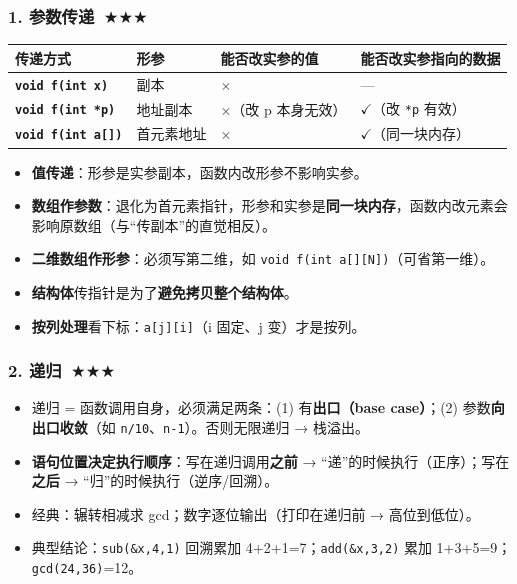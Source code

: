 \documentclass[UTF8,zihao=-4,a4paper]{ctexart}
\newcommand{\cstar}{\textcolor{deepred}{$\bigstar$}}
\newcommand{\cok}{\textcolor{codegreen}{$\checkmark$}}
\newcommand{\cbad}{\textcolor{deepred}{$\times$}}
\begin{document}
\subsubsection*{1. 参数传递\ \cstar\cstar\cstar}
\begin{center}\small
\begin{tabularx}{\linewidth}{>{\bfseries}p{3.4cm} X X X}
\toprule
传递方式 & 形参 & 能否改实参的值 & 能否改实参指向的数据\\
\midrule
\texttt{void f(int x)} & 副本 & \cbad & —\\
\texttt{void f(int *p)} & 地址副本 & \cbad（改 p 本身无效） & \cok（改 \texttt{*p} 有效）\\
\texttt{void f(int a[])} & 首元素地址 & \cbad & \cok（同一块内存）\\
\bottomrule
\end{tabularx}
\end{center}
\begin{itemize}
  \item \textbf{值传递}：形参是实参副本，函数内改形参不影响实参。
  \item \textbf{数组作参数}：退化为首元素指针，形参和实参是\textbf{同一块内存}，函数内改元素会影响原数组（与“传副本”的直觉相反）。
  \item \textbf{二维数组作形参}：必须写第二维，如 \texttt{void f(int a[][N])}（可省第一维）。
  \item \textbf{结构体}传指针是为了\textbf{避免拷贝整个结构体}。
  \item \textbf{按列处理}看下标：\texttt{a[j][i]}（i 固定、j 变）才是按列。
\end{itemize}

\subsubsection*{2. 递归\ \cstar\cstar\cstar}
\begin{itemize}
  \item 递归 = 函数调用自身，必须满足两条：(1) 有\textbf{出口（base case）}；(2) 参数\textbf{向出口收敛}（如 \texttt{n/10}、\texttt{n-1}）。否则无限递归 → 栈溢出。
  \item \textbf{语句位置决定执行顺序}：写在递归调用\textbf{之前} → “递”的时候执行（正序）；写在\textbf{之后} → “归”的时候执行（逆序/回溯）。
  \item 经典：辗转相减求 gcd；数字逐位输出（打印在递归前 → 高位到低位）。
  \item 典型结论：\texttt{sub(\&x,4,1)} 回溯累加 4+2+1=7；\texttt{add(\&x,3,2)} 累加 1+3+5=9；\texttt{gcd(24,36)}=12。
\end{itemize}
\end{document}
